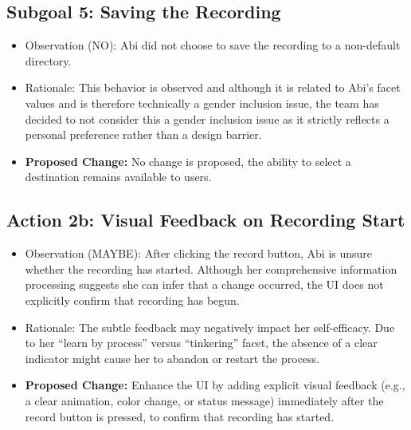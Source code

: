 \documentclass[12pt, titlepage]{article}
\begin{document}
\subsection{Subgoal 5: Saving the Recording}
\begin{itemize}
  \item Observation (NO): Abi did not choose to save the recording to a non-default directory.
  \item Rationale: This behavior is observed and although it is related to Abi's facet values and is therefore technically a 
  gender inclusion issue, the team has decided to not consider this a gender inclusion issue as it strictly reflects a personal 
  preference rather than a design barrier.
  \item \textbf{Proposed Change:} No change is proposed, the ability to select a destination remains available to users.
\end{itemize}

\subsection{Action 2b: Visual Feedback on Recording Start}
\begin{itemize}
  \item Observation (MAYBE): After clicking the record button, Abi is unsure whether the recording has started. Although her 
  comprehensive information processing suggests she can infer that a change occurred, the UI does not explicitly confirm that recording 
  has begun.
  \item Rationale: The subtle feedback may negatively impact her self-efficacy. Due to her “learn by process” versus “tinkering” 
  facet, the absence of a clear indicator might cause her to abandon or restart the process.
  \item \textbf{Proposed Change:} Enhance the UI by adding explicit visual feedback (e.g., a clear animation, color change, 
  or status message) immediately after the record button is pressed, to confirm that recording has started.
\end{itemize}
\end{document}
